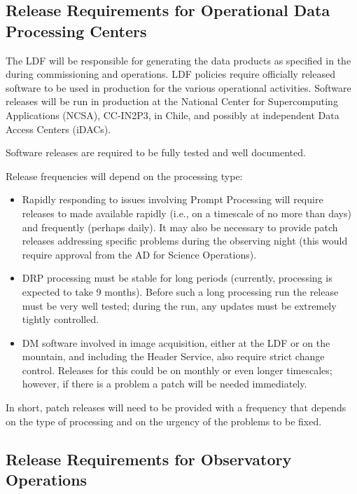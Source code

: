 \subsection{Release Requirements for Operational Data Processing Centers} \label{sec:procreqs}

The \gls{LDF} will be responsible for generating the data products as specified in the \DPDD{} during commissioning and operations.
\gls{LDF} policies require officially released software to be used in production for the various operational activities.
Software releases will be run in production at the National Center for Supercomputing Applications (\gls{NCSA}), CC-IN2P3, in Chile, and possibly at independent Data Access Centers (iDACs).

Software releases are required to be fully tested and well documented.

Release frequencies will depend on the processing type:
\begin{itemize}
\item Rapidly responding to issues involving Prompt Processing will require releases to made available rapidly (i.e., on a timescale of no more than days) and frequently (perhaps daily).
It may also be necessary to provide patch releases addressing specific problems during the observing night (this would require approval from the \gls{AD} for Science \gls{Operations}).
\item \gls{DRP} processing  must be stable for long periods (currently, processing is expected to take 9 months).
Before such a long processing run the release must be very well tested; during the run, any updates must be extremely tightly controlled.
\item DM software involved in image acquisition, either at the \gls{LDF} or on the mountain, and including the Header Service, also require strict change control.
Releases for this could be on monthly or even longer timescales; however, if there is a problem a patch will be needed immediately.
\end{itemize}

In short, patch releases will need to be provided with a frequency that depends on the type of processing and on the urgency of the problems to be fixed.


\subsection{Release Requirements for Observatory Operations} \label{sec:otherreqs}

